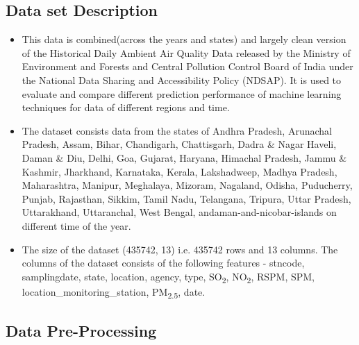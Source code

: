 \documentclass{article}
\begin{document}
\begin{itemize}
    \subsection{\color{brown} Data set Description}
     
    \begin{itemize}
        \item This data is combined(across the years and states) and largely clean version of the Historical Daily Ambient Air Quality Data released by the Ministry of Environment and Forests and Central Pollution Control Board of India under the National Data Sharing and Accessibility Policy (NDSAP).\textsuperscript{\cite{ref6}} It is used to evaluate and compare different prediction performance of machine learning techniques for data of different regions and time. 
        
        \item The dataset consists data from the states of 
        Andhra Pradesh,
        Arunachal Pradesh,
        Assam,
        Bihar,
        Chandigarh,
        Chattisgarh,
        Dadra \& Nagar Haveli,
        Daman \& Diu,
        Delhi, 
        Goa, 
        Gujarat,
        Haryana,
        Himachal Pradesh,
        Jammu & Kashmir,
        Jharkhand,
        Karnataka,
        Kerala,
        Lakshadweep,	
        Madhya Pradesh,	
        Maharashtra,
        Manipur,
        Meghalaya,
        Mizoram,
        Nagaland,
        Odisha,
        Puducherry,
        Punjab,
        Rajasthan,
        Sikkim,
        Tamil Nadu,	
        Telangana,
        Tripura,		
        Uttar Pradesh,
        Uttarakhand,	
        Uttaranchal,
        West Bengal,	
        andaman-and-nicobar-islands on different time of the year. 
        
        \item The size of the dataset (435742, 13) i.e. 435742 rows and 13 columns.  The columns of the dataset consists of the following features - stncode, samplingdate, state, location, agency, type, SO\textsubscript{2}, NO\textsubscript{2}, RSPM, SPM, location\_monitoring\_station, PM\textsubscript{2.5}, date.
    \end{itemize}
    \subsection{\color{brown} Data Pre-Processing}
    \begin{itemize}
        

\end{itemize}
\end{itemize}
\end{document}
